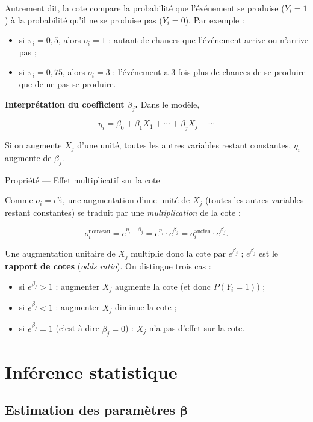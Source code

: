 \documentclass[
  french,
  letterpaper,
  DIV=11,
  numbers=noendperiod]{scrreprt}
\begin{document}
Autrement dit, la cote compare la probabilité que l'événement se
produise (\(Y_i=1\)) à la probabilité qu'il ne se produise pas
(\(Y_i=0\)). Par exemple :

\begin{itemize}
\item
  si \(\pi_i = 0{,}5\), alors \(o_i = 1\) : autant de chances que
  l'événement arrive ou n'arrive pas ;
\item
  si \(\pi_i = 0{,}75\), alors \(o_i = 3\) : l'événement a 3 fois plus
  de chances de se produire que de ne pas se produire.
\end{itemize}

\textbf{Interprétation du coefficient \(\beta_j\).} Dans le modèle,

\[
\eta_i = \beta_0 + \beta_1 X_1 + \cdots + \beta_j X_j + \cdots
\]

Si on augmente \(X_j\) d'une unité, toutes les autres variables restant
constantes, \(\eta_i\) augmente de \(\beta_j\).

{Propriété --- Effet multiplicatif sur la cote}

Comme \(o_i = e^{\eta_i}\), une augmentation d'une unité de \(X_j\)
(toutes les autres variables restant constantes) se traduit par une
\emph{multiplication} de la cote :

\[
o_i^{\text{nouveau}} = e^{\eta_i + \beta_j} = e^{\eta_i} \cdot e^{\beta_j} = o_i^{\text{ancien}} \cdot e^{\beta_j}.
\]

Une augmentation unitaire de \(X_j\) multiplie donc la cote par
\(e^{\beta_j}\) ; \(e^{\beta_j}\) est le \textbf{rapport de cotes}
(\emph{odds ratio}). On distingue trois cas :

\begin{itemize}
\item
  si \(e^{\beta_j} > 1\) : augmenter \(X_j\) augmente la cote (et donc
  \(P(Y_i=1)\)) ;
\item
  si \(e^{\beta_j} < 1\) : augmenter \(X_j\) diminue la cote ;
\item
  si \(e^{\beta_j} = 1\) (c'est-à-dire \(\beta_j = 0\)) : \(X_j\) n'a
  pas d'effet sur la cote.
\end{itemize}

\section{Inférence statistique}\label{infuxe9rence-statistique-1}

\subsection{\texorpdfstring{Estimation des paramètres
\(\boldsymbol{\beta}\)}{Estimation des paramètres \textbackslash boldsymbol\{\textbackslash beta\}}}\label{estimation-des-paramuxe8tres-boldsymbolbeta}
\end{document}

